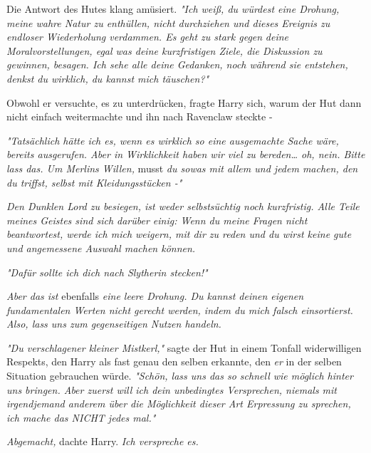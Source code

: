 {Die Antwort des Hutes klang amüsiert. \emph{"Ich weiß, du würdest eine Drohung, meine wahre Natur zu enthüllen, nicht durchziehen und dieses Ereignis zu endloser Wiederholung verdammen. Es geht zu stark gegen} \emph{deine Moralvorstellungen, egal was deine kurzfristigen Ziele, die Diskussion zu gewinnen, besagen. Ich sehe alle deine Gedanken, noch während sie entstehen, denkst du wirklich, du kannst mich täuschen?"}

Obwohl er versuchte, es zu unterdrücken, fragte Harry sich, warum der Hut dann nicht einfach weitermachte und ihn nach Ravenclaw steckte -

\emph{"Tatsächlich hätte ich es, wenn es wirklich so eine ausgemachte Sache wäre, bereits ausgerufen. Aber in Wirklichkeit haben wir viel zu bereden… oh, nein. Bitte lass das. Um Merlins Willen,} musst \emph{du sowas mit allem und jedem machen, den du triffst, selbst mit Kleidungsstücken -"}

\emph{Den Dunklen Lord zu besiegen, ist weder selbstsüchtig noch kurzfristig. Alle Teile meines Geistes sind sich darüber einig: Wenn du meine Fragen nicht beantwortest, werde ich mich weigern, mit dir zu reden und du wirst keine gute und angemessene Auswahl machen können.}

\emph{"Dafür sollte ich dich nach Slytherin stecken!"}

\emph{Aber das ist} ebenfalls \emph{eine leere Drohung. Du kannst deinen eigenen fundamentalen Werten nicht gerecht werden, indem du mich falsch einsortierst. Also, lass uns zum gegenseitigen Nutzen handeln.}

\emph{"Du verschlagener kleiner Mistkerl,"} sagte der Hut in einem Tonfall widerwilligen Respekts, den Harry als fast genau den selben erkannte, den \emph{er} in der selben Situation gebrauchen würde. \emph{"Schön, lass uns das so schnell wie möglich hinter uns bringen. Aber zuerst will ich dein unbedingtes Versprechen, niemals mit irgendjemand anderem über die Möglichkeit dieser Art Erpressung zu sprechen, ich mache das NICHT jedes mal."}

\emph{Abgemacht,} dachte Harry. \emph{Ich verspreche es.}

}
